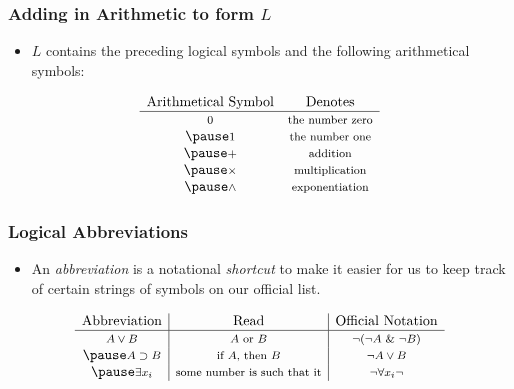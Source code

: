 \begin{frame}
\frametitle{Adding in Arithmetic to form $L$}

\begin{itemize}[<+->]

\item $L$ contains the preceding logical symbols and the following arithmetical symbols:
\end{itemize}
\[
\begin{array}{cc}\label{gloss:exponentiation}
 \text{{Arithmetical Symbol}} &\text{{Denotes}}   \\
\hline
 \text{\footnotesize 0}   & \text{\footnotesize  the number zero}  \\ \pause 
  \text{\footnotesize 1}  & \text{\footnotesize  the number one}  \\ \pause 
    \text{\footnotesize $+$}  & \text{\footnotesize  addition}  \\ \pause 
        \text{\footnotesize $\times$}  & \text{\footnotesize  multiplication}  \\ \pause 
            \text{\footnotesize $\wedge$}  & \text{\footnotesize  exponentiation} 
\end{array}
\]



\end{frame}

\begin{frame}
\frametitle{Logical Abbreviations}

\begin{itemize}[<+->]

\item An \emph{abbreviation} is a notational \textit{shortcut} to make it easier for us to keep track of certain strings of symbols on our official list. 
\end{itemize}
 \pause 
\[
\begin{array}{c|c|c}
 \text{{Abbreviation}}  &\text{{Read}} &\text{{Official Notation}}   \\
\hline
\text{\footnotesize $A \vee B$}  & \text{\footnotesize  $A$ or $B$}  & \text{\footnotesize  $\neg(\neg A  \ \& \ \neg B)$} \\ \pause 
\text{\footnotesize $A \supset B$}  & \text{\footnotesize  if $A$, then $B$}  & \text{\footnotesize  $\neg A  \vee B$} \\ \pause 
\text{\footnotesize $\exists x_i$}  & \text{\footnotesize  some number is such that it}  & \text{\footnotesize  $\neg \forall x_i \neg$} \\ 
\end{array}
\]


\end{frame}

